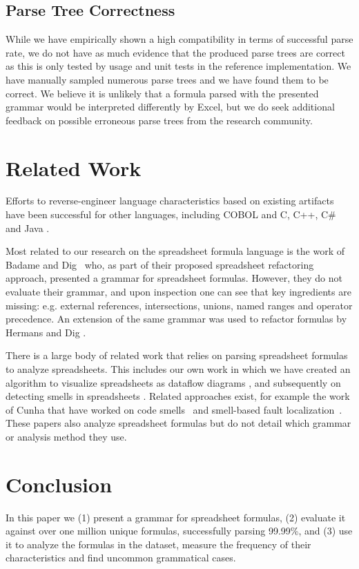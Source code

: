 \documentclass[conference]{IEEEtran}
\begin{document}
\subsection{Parse Tree Correctness}

While we have empirically shown a high compatibility in terms of successful parse rate, we do not have as much evidence that the produced parse trees are correct as this is only tested by usage and unit tests in the reference implementation. We have manually sampled numerous parse trees and we have found them to be correct. We believe it is unlikely that a formula parsed with the presented grammar would be interpreted differently by Excel, but we do seek additional feedback on possible erroneous parse trees from the research community.

\section{Related Work}
\label{section:relatedWork}
Efforts to reverse-engineer language characteristics based on existing artifacts have been successful for other languages, including COBOL \cite{van1997obtaining} and C, C++, C\# and Java \cite{zaytsev2010recovery}.

Most related to our research on the spreadsheet formula language is the work of Badame and Dig~\cite{badame2012refactoring} who, as part of their proposed spreadsheet refactoring approach, presented a grammar for spreadsheet formulas. However, they do not evaluate their grammar, and upon inspection one can see that key ingredients are missing: e.g. external references, intersections, unions, named ranges and operator precedence. An extension of the same grammar was used to refactor formulas by Hermans and Dig \cite{hermans2014bumblebee}.

There is a large body of related work that relies on parsing spreadsheet formulas to analyze spreadsheets. This includes our own work in which we have created an algorithm to visualize spreadsheets as dataflow diagrams \cite{DBLP:conf/icse/HermansPD11}, and subsequently on detecting smells in spreadsheets \cite{DBLP:conf/icse/HermansPD12,DBLP:conf/icsm/Hermans212}. Related approaches exist, for example the work of Cunha that have worked on code smells~\cite{iccsa12} and smell-based fault localization~\cite{conf/icsme/CunhaFMPS14}. These papers also analyze spreadsheet formulas but do not detail which grammar or analysis method they use.

\section{Conclusion}
\label{section:conclusion}
In this paper we (1) present a grammar for spreadsheet formulas, (2) evaluate it against over one million unique formulas, successfully parsing 99.99\%, and (3) use it to analyze the formulas in the dataset, measure the frequency of their characteristics and find uncommon grammatical cases.
\end{document}

